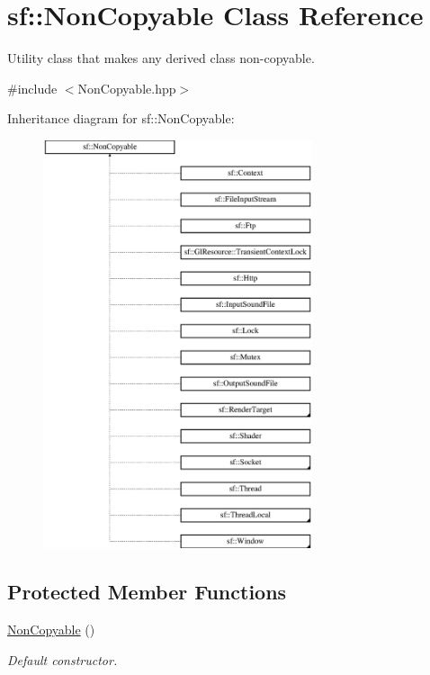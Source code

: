 \hypertarget{classsf_1_1_non_copyable}{}\section{sf\+:\+:Non\+Copyable Class Reference}
\label{classsf_1_1_non_copyable}


Utility class that makes any derived class non-\/copyable.  




{\ttfamily \#include $<$Non\+Copyable.\+hpp$>$}

Inheritance diagram for sf\+:\+:Non\+Copyable\+:\begin{figure}[H]
\begin{center}
\leavevmode
\includegraphics[height=12.000000cm]{classsf_1_1_non_copyable}
\end{center}
\end{figure}
\subsection*{Protected Member Functions}
\begin{DoxyCompactItemize}
\item 
\hyperlink{classsf_1_1_non_copyable_a2110add170580fdb946f887719da6860}{Non\+Copyable} ()
\begin{DoxyCompactList}\small\item\em Default constructor. \end{DoxyCompactList}\end{DoxyCompactItemize}


